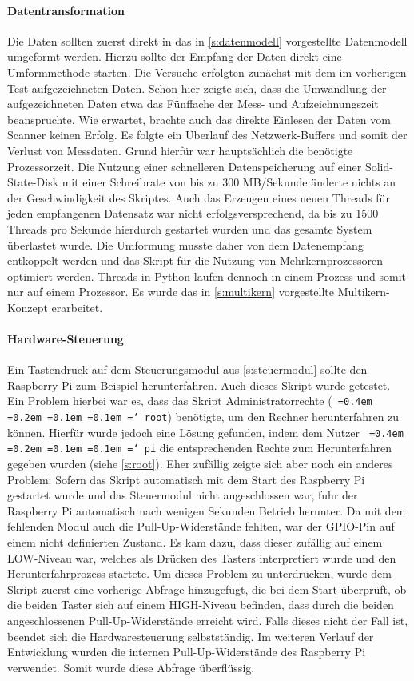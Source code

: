 \documentclass[a4paper,12pt,bibliography=totoc, listof=totoc,titlepage,pointlessnumbers]{scrreprt}
\newcommand*\justify{%
  \fontdimen2\font=0.4em%
  \fontdimen3\font=0.2em%
  \fontdimen4\font=0.1em%
  \fontdimen7\font=0.1em%
  \hyphenchar\font=`\-%
}
\newcommand{\code}[1]{\texttt{\justify{#1}}}
\begin{document}
\paragraph{Datentransformation}
Die Daten sollten zuerst direkt in das in \autoref{s:datenmodell} vorgestellte Datenmodell umgeformt werden. Hierzu sollte der Empfang der Daten direkt eine Umformmethode starten. Die Versuche erfolgten zunächst mit dem im vorherigen Test aufgezeichneten Daten. Schon hier zeigte sich, dass die Umwandlung der aufgezeichneten Daten etwa das Fünffache der Mess- und Aufzeichnungszeit beanspruchte. Wie erwartet, brachte auch das direkte Einlesen der Daten vom Scanner keinen Erfolg. Es folgte ein Überlauf des Netzwerk-Buffers und somit der Verlust von Messdaten. Grund hierfür war haupt\-säch\-lich die benötigte Prozessorzeit. Die Nutzung einer schnelleren Datenspeicherung auf einer Solid-State-Disk mit einer Schreibrate von bis zu 300 MB/Sekunde änderte nichts an der Geschwindigkeit des Skriptes. Auch das Erzeugen eines neuen Threads für jeden empfangenen Datensatz war nicht erfolgsversprechend, da bis zu 1500 Threads pro Sekunde hierdurch gestartet wurden und das gesamte System überlastet wurde. Die Umformung musste daher von dem Datenempfang entkoppelt werden und das Skript für die Nutzung von Mehrkernprozessoren optimiert werden. Threads in Python laufen dennoch in einem Prozess und somit nur auf einem Prozessor. Es wurde das in \autoref{s:multikern} vorgestellte Multikern-Konzept erarbeitet.

\paragraph{Hardware-Steuerung}
Ein Tastendruck auf dem Steuerungsmodul aus \autoref{s:steuermodul} sollte den Rasp\-berry Pi zum Beispiel herunterfahren. Auch dieses Skript wurde getestet. Ein Problem hierbei war es, dass das Skript Administratorrechte (\code{root}) benötigte, um den Rechner herunterfahren zu können. Hierfür wurde jedoch eine Lösung gefunden, indem dem Nutzer \code{pi} die entsprechenden Rechte zum Herunterfahren gegeben wurden (siehe \autoref{s:root}). Eher zufällig zeigte sich aber noch ein anderes Problem: Sofern das Skript automatisch mit dem Start des Rasp\-berry Pi gestartet wurde und das Steuermodul nicht angeschlossen war, fuhr der Rasp\-berry Pi automatisch nach wenigen Sekunden Betrieb herunter. Da mit dem fehlenden Modul auch die Pull-Up-Widerstände fehlten, war der GPIO-Pin auf einem nicht definierten Zustand. Es kam dazu, dass dieser zufällig auf einem LOW-Niveau war, welches als Drücken des Tasters interpretiert wurde und den Herunterfahrprozess startete. Um dieses Problem zu unterdrücken, wurde dem Skript zuerst eine vorherige Abfrage hinzugefügt, die bei dem Start überprüft, ob die beiden Taster sich auf einem HIGH-Niveau befinden, dass durch die beiden angeschlossenen Pull-Up-Widerstände erreicht wird. Falls dieses nicht der Fall ist, beendet sich die Hardwaresteuerung selbst\-stän\-dig. Im weiteren Verlauf der Entwicklung wurden die internen Pull-Up-Widerstände des Rasp\-berry Pi verwendet. Somit wurde diese Abfrage überflüssig.
\end{document}
